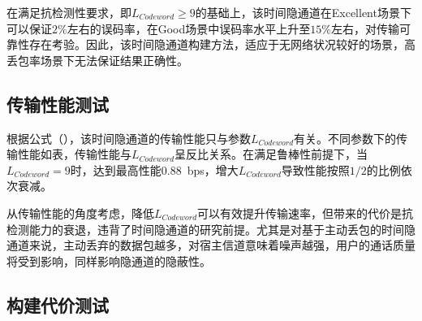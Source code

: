 在满足抗检测性要求，即$L_{Codeword}\ge 9$的基础上，该时间隐通道在Excellent场景下可以保证$2\%$左右的误码率，在Good场景中误码率水平上升至$15\%$左右，对传输可靠性存在考验。因此，该时间隐通道构建方法，适应于无网络状况较好的场景，高丢包率场景下无法保证结果正确性。

\subsection{传输性能测试}
\label{chap:zigzag:results:throughput}


根据公式（），该时间隐通道的传输性能只与参数$L_{Codeword}$有关。不同参数下的传输性能如表，传输性能与$L_{Codeword}$呈反比关系。在满足鲁棒性前提下，当$L_{Codeword}=9$时，达到最高性能0.88\ bps，增大$L_{Codeword}$导致性能按照$1/2$的比例依次衰减。

从传输性能的角度考虑，降低$L_{Codeword}$可以有效提升传输速率，但带来的代价是抗检测能力的衰退，违背了时间隐通道的研究前提。尤其是对基于主动丢包的时间隐通道来说，主动丢弃的数据包越多，对宿主信道意味着噪声越强，用户的通话质量将受到影响，同样影响隐通道的隐蔽性。

\subsection{构建代价测试}
\label{chap:zigzag:results:cost}

